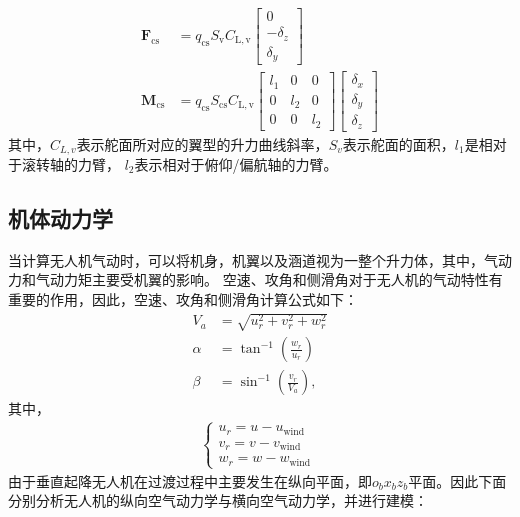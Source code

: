 \begin{align}
   \mathbf{F}_{\mathrm{cs}} & = q_{\mathrm{cs}} S_{\mathrm{v}} C_{\mathrm{L,v}}\left[\begin{array}{c}
    0\\
    -\delta_{z}  \\
    \delta_{y} 
    \end{array}\right] \\
    \mathbf{M}_{\mathrm{cs}} & = q_{\mathrm{cs}} S_{\mathrm{cs}} C_{\mathrm{L,v}}\left[\begin{array}{ccc}
    l_{1} & 0 & 0 \\
    0 & l_{2} & 0 \\
    0 & 0 & l_{2}
    \end{array}\right]\left[\begin{array}{c}
    \delta_{x} \\
    \delta_{y} \\
    \delta_{z}
    \end{array}\right]
\end{align}
其中，$C_{L,v}$表示舵面所对应的翼型的升力曲线斜率，$S_{v}$表示舵面的面积，$l_{1}$是相对于滚转轴的力臂，
$l_{2}$表示相对于俯仰/偏航轴的力臂。

\subsection{机体动力学}
当计算无人机气动时，可以将机身，机翼以及涵道视为一整个升力体\cite{zhang2013new}，其中，气动力和气动力矩主要受机翼的影响。
空速、攻角和侧滑角对于无人机的气动特性有重要的作用，因此，空速、攻角和侧滑角计算公式如下：
\begin{align}
    V_{a} & =\sqrt{u_{r}^{2}+v_{r}^{2}+w_{r}^{2}} \\
    \alpha & =\tan ^{-1}\left(\frac{w_{r}}{u_{r}}\right) \\
    \beta & =\sin ^{-1}\left(\frac{v_{r}}{V_{a}}\right),
\end{align}
其中，
\begin{align*}
    \left\{\begin{matrix}
        u_{r} = u-u_{\text {wind }}\\
        v_{r} = v-v_{\text {wind }}\\
        w_{r} = w-w_{\text {wind }}
       \end{matrix}\right.
\end{align*}
由于垂直起降无人机在过渡过程中主要发生在纵向平面，即$o_{b}x_{b}z_{b}$平面。因此下面分别分析无人机的纵向空气动力学与横向空气动力学，并进行建模：
